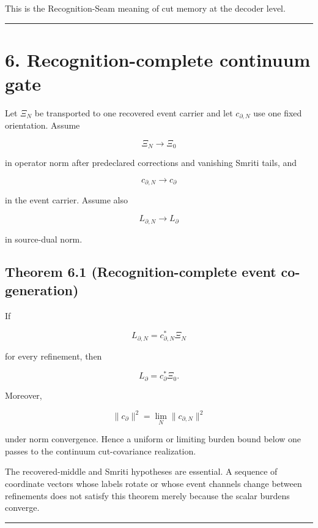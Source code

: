 This is the Recognition-Seam meaning of cut memory at the decoder level.

\begin{center}\rule{0.5\linewidth}{0.5pt}\end{center}

\hypertarget{recognition-complete-continuum-gate}{%
\section{6. Recognition-complete continuum gate}\label{recognition-complete-continuum-gate}}

Let \(\Xi_N\) be transported to one recovered event carrier and let
\(c_{\partial,N}\) use one fixed orientation. Assume

\[
\Xi_N\longrightarrow\Xi_0
\]

in operator norm after predeclared corrections and vanishing Smriti tails, and

\[
c_{\partial,N}\longrightarrow c_\partial
\]

in the event carrier. Assume also

\[
L_{\partial,N}\longrightarrow L_\partial
\]

in source-dual norm.

\hypertarget{theorem-6.1-recognition-complete-event-co-generation}{%
\subsection{Theorem 6.1 (Recognition-complete event co-generation)}\label{theorem-6.1-recognition-complete-event-co-generation}}

If

\[
L_{\partial,N}
=c_{\partial,N}^*\Xi_N
\]

for every refinement, then

\[
\boxed{
L_\partial=c_\partial^*\Xi_0.
}
\]

Moreover,

\[
\boxed{
\|c_\partial\|^2
=\lim_N\|c_{\partial,N}\|^2
}
\]

under norm convergence. Hence a uniform or limiting burden bound below one
passes to the continuum cut-covariance realization.

The recovered-middle and Smriti hypotheses are essential. A sequence of
coordinate vectors whose labels rotate or whose event channels change between
refinements does not satisfy this theorem merely because the scalar burdens
converge.

\begin{center}\rule{0.5\linewidth}{0.5pt}\end{center}

